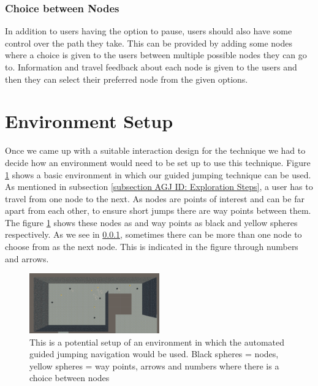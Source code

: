 \subsubsection{Choice between Nodes}
\label{subsubsection AGJ ID ES: Choice between Nodes}
In addition to users having the option to pause, users should also have some control over the path they take. This can be provided by adding some nodes where a choice is given to the users between multiple possible nodes they can go to. Information and travel feedback about each node is given to the users and then they can select their preferred node from the given options. 

\section{Environment Setup}
\label{section AGJ: Environment Setup}

Once we came up with a suitable interaction design for the technique we had to decide how an environment would need to be set up to use this technique. Figure \ref{fig:interaction-design-layout} shows a basic environment in which our guided jumping technique can be used. As mentioned in subsection \ref{subsection AGJ ID: Exploration Steps}, a user has to travel from one node to the next. As nodes are points of interest and can be far apart from each other, to ensure short jumps there are way points between them. The figure \ref{fig:interaction-design-layout} shows these nodes as and way points as black and yellow spheres respectively. As we see in \ref{subsubsection AGJ ID ES: Choice between Nodes}, sometimes there can be more than one node to choose from as the next node. This is indicated in the figure through numbers and arrows.     
\begin{figure}[]
	\centering
	\includegraphics[width=0.5\textwidth]{images/interaction-design-layout.pdf} 
	\caption{This is a potential setup of an environment in which the automated guided jumping navigation would be used. Black spheres = nodes, yellow spheres = way points, arrows and numbers where there is a choice between nodes}
	\label{fig:interaction-design-layout}
\end{figure}

